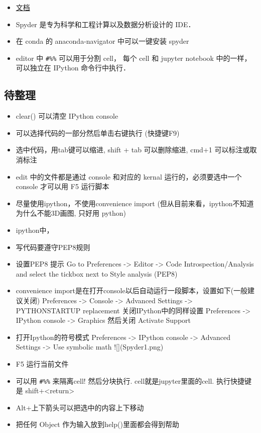 
\begin{issues}
\issueDraft
\end{issues}

\begin{itemize}
\item \href{https://docs.spyder-ide.org/current/}{文档}
\item Spyder 是专为科学和工程计算以及数据分析设计的 IDE．
\item 在 conda 的 anaconda-navigator 中可以一键安装 spyder
\item editor 中 \verb|#%%| 可以用于分割 cell， 每个 cell 和 jupyter notebook 中的一样， 可以独立在 IPython 命令行中执行．
\end{itemize}

\subsection{待整理}
\begin{itemize}
\item clear() 可以清空 IPython console
\item 可以选择代码的一部分然后单击右键执行 (快捷键F9)
\item 选中代码，用tab键可以缩进, shift + tab 可以删除缩进, cmd+1 可以标注或取消标注
\item edit 中的文件都是通过 console 和对应的 kernal 运行的，必须要选中一个 console 才可以用 F5 运行脚本
\item 尽量使用ipython，不使用convenience import (但从目前来看，ipython不知道为什么不能3D画图, 只好用 python)
\item ipython中，%
\item 写代码要遵守PEP8规则
\item 设置PEP8 提示
  Go to Preferences -> Editor -> Code Introspection/Analysis and select the tickbox next to Style analysis (PEP8)
\item convenience import是在打开console以后自动运行一段脚本，设置如下(一般建议关闭)
   Preferences -> Console -> Advanced Settings -> PYTHONSTARTUP replacement
   关闭IPython中的同样设置
   Preferences -> IPython console -> Graphics 然后关闭 Activate Support
\item 打开Ipython的符号模式
   Preferences -> IPython console -> Advanced Settings -> Use symbolic math
![](Spyder1.png)

\item F5 运行当前文件
\item 可以用 \verb|#%%| 来隔离cell! 然后分块执行. cell就是jupyter里面的cell. 执行快捷键是 shift+<return>
\item Alt+上下箭头可以把选中的内容上下移动
\item 把任何 Object 作为输入放到help()里面都会得到帮助
\end{itemize}
